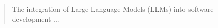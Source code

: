 \begin{abstract}
The integration of Large Language Models (LLMs) into software development ...

\end{abstract}